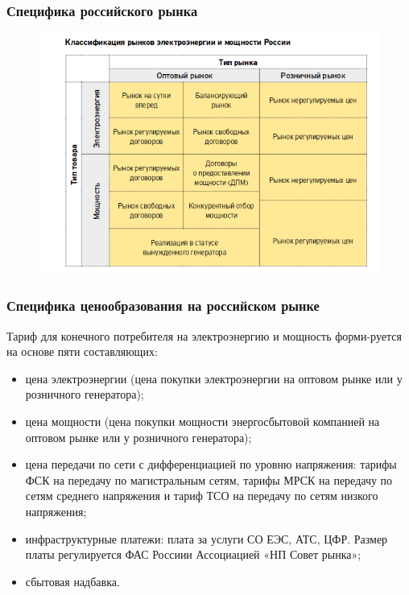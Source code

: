 \documentclass[c, dvipsnames]{beamer}  %
\begin{document}
\begin{frame}[shrink=5]


\frametitle{Специфика российского рынка} 



\begin{figure}
	\centering
	\includegraphics[width=0.7\linewidth]{screenshot004}
	\label{fig:screenshot004}
\end{figure}


\end{frame}


\begin{frame}[shrink=5]
\frametitle{Специфика ценообразования на российском рынке} 

Тариф для конечного потребителя на электроэнергию и мощность форми-руется на основе пяти составляющих:
\begin{itemize}
	\item 
 цена электроэнергии (цена покупки электроэнергии на оптовом рынке или у розничного генератора);
\item  цена мощности (цена покупки мощности энергосбытовой компанией на оптовом рынке или у розничного генератора);
\item  цена передачи по сети с дифференциацией по уровню напряжения: тарифы ФСК на передачу по магистральным сетям, тарифы МРСК на передачу по сетям среднего напряжения и тариф ТСО на передачу по сетям низкого напряжения;
\item  инфраструктурные платежи: плата за услуги СО ЕЭС, АТС, ЦФР. Размер платы регулируется ФАС Россиии Ассоциацией «НП Совет рынка»;
\item   сбытовая надбавка.

\end{itemize}
\end{frame}
\end{document}
